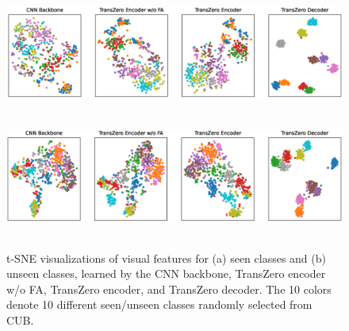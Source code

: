 \documentclass[letterpaper]{article} %
\begin{document}
	
	
	\begin{figure}[t]
		\begin{center}
			\hspace{0.5mm}\hspace{0mm}
			\includegraphics[width=16cm,height=4cm]{./figures/tsne-seen.pdf}\\ 
			\hspace{0.5mm}\hspace{0.7mm}
			\includegraphics[width=16cm,height=4cm]{./figures/tsne-unseen.pdf}\\\vspace{-2mm}
			\caption{t-SNE visualizations of visual features for (a) seen classes and (b) unseen classes, learned by the CNN backbone, TransZero encoder w/o FA, TransZero encoder, and TransZero decoder. The 10 colors denote 10 different seen/unseen classes randomly selected from CUB.}
			\label{fig:tsne}\vspace{-6mm}
		\end{center}
	\end{figure}
	
\end{document}
